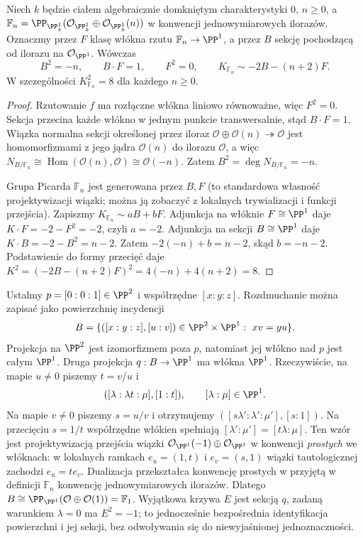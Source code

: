 \begin{stwierdzenie}
\label{st:ga6-hirzebruch}
Niech $k$ będzie ciałem algebraicznie domkniętym
charakterystyki $0$, $n\ge0$, a $\mathbb F_n=
\PP_{\PP^1_k}(\mathcal O_{\PP^1_k}\oplus\mathcal O_{\PP^1_k}(n))$
w konwencji jednowymiarowych ilorazów. Oznaczmy przez
$F$ klasę włókna rzutu $\mathbb F_n\to\PP^1$,
a przez $B$ sekcję pochodzącą od ilorazu na
$\mathcal O_{\PP^1}$. Wówczas
\[
 B^2=-n,\qquad B\cdot F=1,\qquad F^2=0,
 \qquad K_{\mathbb F_n}\sim-2B-(n+2)F.
\]
W szczególności $K_{\mathbb F_n}^2=8$ dla każdego $n\ge0$.
\end{stwierdzenie}
\begin{proof}
Rzutowanie $f$ ma rozłączne włókna liniowo równoważne,
więc $F^2=0$. Sekcja przecina każde włókno w jednym
punkcie transwersalnie, stąd $B\cdot F=1$.
Wiązka normalna sekcji określonej przez iloraz
$\mathcal O\oplus\mathcal O(n)\twoheadrightarrow\mathcal O$
jest homomorfizmami z jego jądra $\mathcal O(n)$
do ilorazu $\mathcal O$, a więc
$N_{B/\mathbb F_n}\cong\operatorname{Hom}
(\mathcal O(n),\mathcal O)\cong\mathcal O(-n)$.
Zatem $B^2=\deg N_{B/\mathbb F_n}=-n$.

Grupa Picarda $\mathbb F_n$ jest generowana przez
$B,F$ (to standardowa własność projektywizacji
wiązki; można ją zobaczyć z lokalnych trywializacji
i funkcji przejścia). Zapiszmy
$K_{\mathbb F_n}\sim aB+bF$. Adjunkcja na włóknie
$F\cong\PP^1$ daje $K\cdot F=-2-F^2=-2$,
czyli $a=-2$. Adjunkcja na sekcji $B\cong\PP^1$
daje $K\cdot B=-2-B^2=n-2$.
Zatem $-2(-n)+b=n-2$, skąd $b=-n-2$.
Podstawienie do formy przecięć daje
$K^2=(-2B-(n+2)F)^2=4(-n)+4(n+2)=8$.
\end{proof}

\begin{przyklad}
\label{prz:ga6-f1}
Ustalmy $p=[0:0:1]\in\PP^2$ i współrzędne $[x:y:z]$.
Rozdmuchanie można zapisać jako powierzchnię incydencji
\[
B=\{([x:y:z],[u:v])\in\PP^2\times\PP^1:\ xv=yu\}.
\]
Projekcja na $\PP^2$ jest izomorfizmem poza $p$, natomiast
jej włókno nad $p$ jest całym $\PP^1$.
Druga projekcja $q:B\to\PP^1$ ma włókna $\PP^1$.
Rzeczywiście, na mapie $u\ne0$ piszemy $t=v/u$ i
\[
([\lambda:\lambda t:\mu],[1:t]),\qquad[\lambda:\mu]\in\PP^1.
\]
Na mapie $v\ne0$ piszemy $s=u/v$ i otrzymujemy
$([s\lambda':\lambda':\mu'],[s:1])$.
Na przecięciu $s=1/t$ współrzędne włókien spełniają
$[\lambda':\mu']=[t\lambda:\mu]$. Ten wzór jest
projektywizacją przejścia wiązki
$\mathcal O_{\PP^1}(-1)\oplus\mathcal O_{\PP^1}$
w konwencji \emph{prostych} we włóknach: w lokalnych
ramkach $e_u=(1,t)$ i $e_v=(s,1)$ wiązki tautologicznej
zachodzi $e_u=t e_v$.
Dualizacja przekształca konwencję prostych w przyjętą
w definicji $\mathbb F_n$ konwencję jednowymiarowych ilorazów.
Dlatego
$B\cong\PP_{\PP^1}(\mathcal O\oplus\mathcal O(1))=\mathbb F_1$.
Wyjątkowa krzywa $E$ jest sekcją $q$, zadaną warunkiem
$\lambda=0$ ma $E^2=-1$; to jednocześnie
bezpośrednia identyfikacja powierzchni i jej sekcji,
bez odwoływania się do niewyjaśnionej jednoznaczności.
\end{przyklad}

